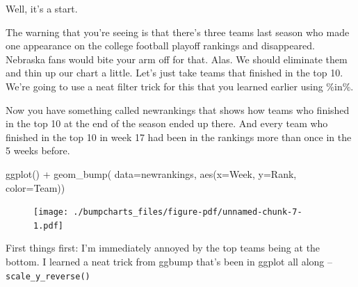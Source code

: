 \documentclass[
  letterpaper,
  DIV=11,
  numbers=noendperiod]{scrreprt}
\newenvironment{Shaded}{\begin{snugshade}}{\end{snugshade}}
\newcommand{\AttributeTok}[1]{\textcolor[rgb]{0.40,0.45,0.13}{#1}}
\newcommand{\DecValTok}[1]{\textcolor[rgb]{0.68,0.00,0.00}{#1}}
\newcommand{\FunctionTok}[1]{\textcolor[rgb]{0.28,0.35,0.67}{#1}}
\newcommand{\NormalTok}[1]{\textcolor[rgb]{0.00,0.23,0.31}{#1}}
\newcommand{\OtherTok}[1]{\textcolor[rgb]{0.00,0.23,0.31}{#1}}
\newcommand{\SpecialCharTok}[1]{\textcolor[rgb]{0.37,0.37,0.37}{#1}}
\begin{document}
Well, it's a start.

The warning that you're seeing is that there's three teams last season
who made one appearance on the college football playoff rankings and
disappeared. Nebraska fans would bite your arm off for that. Alas. We
should eliminate them and thin up our chart a little. Let's just take
teams that finished in the top 10. We're going to use a neat filter
trick for this that you learned earlier using \%in\%.

\begin{Shaded}
\end{Shaded}

Now you have something called newrankings that shows how teams who
finished in the top 10 at the end of the season ended up there. And
every team who finished in the top 10 in week 17 had been in the
rankings more than once in the 5 weeks before.

\begin{Shaded}
\begin{Highlighting}[]
\FunctionTok{ggplot}\NormalTok{() }\SpecialCharTok{+} 
  \FunctionTok{geom\_bump}\NormalTok{(}
    \AttributeTok{data=}\NormalTok{newrankings, }\FunctionTok{aes}\NormalTok{(}\AttributeTok{x=}\NormalTok{Week, }\AttributeTok{y=}\NormalTok{Rank, }\AttributeTok{color=}\NormalTok{Team))}
\end{Highlighting}
\end{Shaded}

\begin{figure}[H]

{\centering \texttt{[image: ./bumpcharts\_files/figure-pdf/unnamed-chunk-7-1.pdf]}

}

\end{figure}

First things first: I'm immediately annoyed by the top teams being at
the bottom. I learned a neat trick from ggbump that's been in ggplot all
along -- \texttt{scale\_y\_reverse()}
\end{document}
